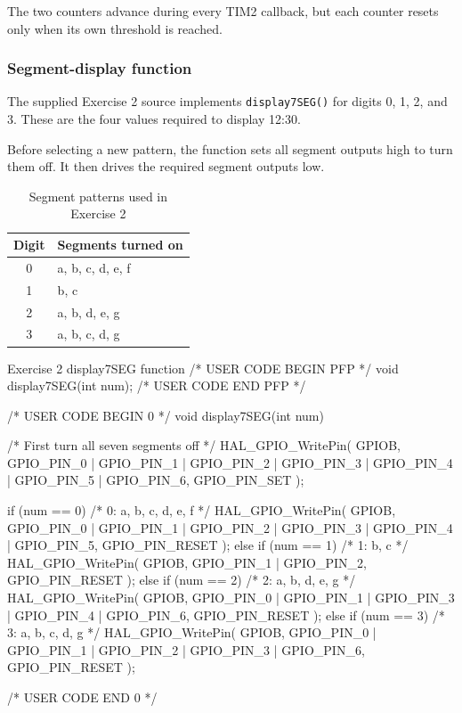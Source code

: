 \documentclass[a4paper]{article}
\begin{document}
The two counters advance during every TIM2 callback,
but each counter resets only when its own threshold
is reached.

\subsubsection{Segment-display function}

The supplied Exercise 2 source implements
\texttt{display7SEG()} for digits 0, 1, 2, and 3.
These are the four values required to display 12:30.

Before selecting a new pattern, the function sets
all segment outputs high to turn them off.
It then drives the required segment outputs low.

\begin{table}[H]
    \centering
    \caption{Segment patterns used in Exercise 2}
    \label{tab:ex02-patterns}
    \begin{tabular}{cl}
        \toprule
        \textbf{Digit} & \textbf{Segments turned on} \\
        \midrule
        0 & a, b, c, d, e, f \\
        1 & b, c \\
        2 & a, b, d, e, g \\
        3 & a, b, c, d, g \\
        \bottomrule
    \end{tabular}
\end{table}

\begin{stmcode}{Exercise 2 display7SEG function}
/* USER CODE BEGIN PFP */
void display7SEG(int num);
/* USER CODE END PFP */

/* USER CODE BEGIN 0 */
void display7SEG(int num)
{
    /* First turn all seven segments off */
    HAL_GPIO_WritePin(
        GPIOB,
        GPIO_PIN_0 | GPIO_PIN_1 | GPIO_PIN_2 | GPIO_PIN_3 |
        GPIO_PIN_4 | GPIO_PIN_5 | GPIO_PIN_6,
        GPIO_PIN_SET
    );

    if (num == 0)
    {
        /* 0: a, b, c, d, e, f */
        HAL_GPIO_WritePin(
            GPIOB,
            GPIO_PIN_0 | GPIO_PIN_1 | GPIO_PIN_2 |
            GPIO_PIN_3 | GPIO_PIN_4 | GPIO_PIN_5,
            GPIO_PIN_RESET
        );
    }
    else if (num == 1)
    {
        /* 1: b, c */
        HAL_GPIO_WritePin(
            GPIOB,
            GPIO_PIN_1 | GPIO_PIN_2,
            GPIO_PIN_RESET
        );
    }
    else if (num == 2)
    {
        /* 2: a, b, d, e, g */
        HAL_GPIO_WritePin(
            GPIOB,
            GPIO_PIN_0 | GPIO_PIN_1 | GPIO_PIN_3 |
            GPIO_PIN_4 | GPIO_PIN_6,
            GPIO_PIN_RESET
        );
    }
    else if (num == 3)
    {
        /* 3: a, b, c, d, g */
        HAL_GPIO_WritePin(
            GPIOB,
            GPIO_PIN_0 | GPIO_PIN_1 | GPIO_PIN_2 |
            GPIO_PIN_3 | GPIO_PIN_6,
            GPIO_PIN_RESET
        );
    }
}
/* USER CODE END 0 */
\end{stmcode}
\end{document}

